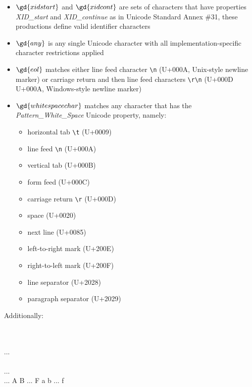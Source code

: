 \begin{bnfutils}
\begin{itemize}
  \item \(\gd{xidstart}\) and \(\gd{xidcont}\) are sets of characters that have properties \emph{XID\_start} and \emph{XID\_continue} as in Unicode Standard Annex \#31\cite{UAX31}, these productions define valid identifier characters
  \item \(\gd{any}\) is any single Unicode character with all implementation-specific character restrictions applied
  \item \(\gd{eol}\) matches either line feed character \texttt{\textbackslash n} (U+000A, Unix-style newline marker) or carriage return and then line feed characters \texttt{\textbackslash r\textbackslash n} (U+000D U+000A, Windows-style newline marker)
  \item \(\gd{whitespacechar}\) matches any character that has the \emph{Pattern\_White\_Space} Unicode property, namely:

    \begin{itemize}
      \item horizontal tab \texttt{\textbackslash t} (U+0009)
      \item line feed \texttt{\textbackslash n} (U+000A)
      \item vertical tab (U+000B)
      \item form feed (U+000C)
      \item carriage return \texttt{\textbackslash r} (U+000D)
      \item space (U+0020)
      \item next line (U+0085)
      \item left-to-right mark (U+200E)
      \item right-to-left mark (U+200F)
      \item line separator (U+2028)
      \item paragraph separator (U+2029)
    \end{itemize}
\end{itemize}
\end{bnfutils}

Additionally:

\begin{bnf}
   \eq {} \\
  \\
     \gor ...  \\
     \\
     \gor ...  \\
     \gor ... 
              \gor A \gor B \gor ... \gor F
              \gor a \gor b \gor ... \gor f
\end{bnf}


